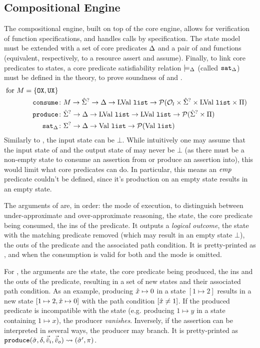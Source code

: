\subsection{Compositional Engine}

The compositional engine, built on top of the core engine, allows for verification of function specifications, and handles calls by specification. The state model must be extended with a set of core predicates $\Delta$ and a pair of \consume{} and \produce{} functions (equivalent, respectively, to a resource assert and assume). Finally, to link core predicates to states, a core predicate satisfiability relation $\models_{\Delta}$ (called $\texttt{sat}_{\Delta}$) must be defined in the theory, to prove soundness of \consume{} and \produce.
\begin{align*}
	\text{for }M=\{\texttt{OX}, \texttt{UX}\}\\
	\texttt{consume} &\colon M\rightarrow \hat{\Sigma}^? \rightarrow \Delta \rightarrow \text{LVal}~\texttt{list} \rightarrow {\cal P}({\cal O}_l \times \hat{\Sigma}^? \times \text{LVal}~\texttt{list} \times \Pi) \\
	\texttt{produce} &\colon \hat{\Sigma}^? \rightarrow \Delta \rightarrow \text{LVal}~\texttt{list} \rightarrow \text{LVal}~\texttt{list} \rightarrow {\cal P}(\hat{\Sigma}^? \times \Pi)\\
	\texttt{sat}_\Delta &\colon\Sigma^? \rightarrow \Delta \rightarrow \text{Val}~\texttt{list} \rightarrow {\cal P}(\text{Val}~\texttt{list})
\end{align*}
Similarly to \execac, the input state can be $\bot$. While intuitively one may assume that the input state of \consume{} and the output state of \produce{} may never be $\bot$ (as there must be a non-empty state to consume an assertion from or produce an assertion into), this would limit what core predicates can do. In particular, this means an $\textit{emp}$ predicate couldn't be defined, since it's production on an empty state results in an empty state.

The arguments of \consume{} are, in order: the mode of execution, to distinguish between under-approximate and over-approximate reasoning, the state, the core predicate being consumed, the ins of the predicate. It outputs a \emph{logical outcome}, the state with the matching predicate removed (which may result in an empty state $\bot$), the outs of the predicate and the associated path condition. It is pretty-printed as , and when the consumption is valid for both \OX{} and \UX{} the mode is omitted.

For \produce{}, the arguments are the state, the core predicate being produced, the ins and the outs of the predicate, resulting in a set of new states and their associated path condition. As an example, producing $\hat{x} \mapsto 0$ in a state $[1 \mapsto 2]$ results in a new state $[1\mapsto 2, \hat{x} \mapsto 0]$ with the path condition $[\hat{x} \neq 1]$. If the produced predicate is incompatible with the state (e.g. producing $1 \mapsto y$ in a state containing $1 \mapsto x$), the producer \emph{vanishes}. Inversely, if the assertion can be interpreted in several ways, the producer may branch. It is pretty-printed as $\texttt{produce}(\hat{\sigma},\delta,\vec{\hat{v}}_i,\vec{\hat{v}}_o)\rightsquigarrow (\hat{\sigma}', \pi)$.

